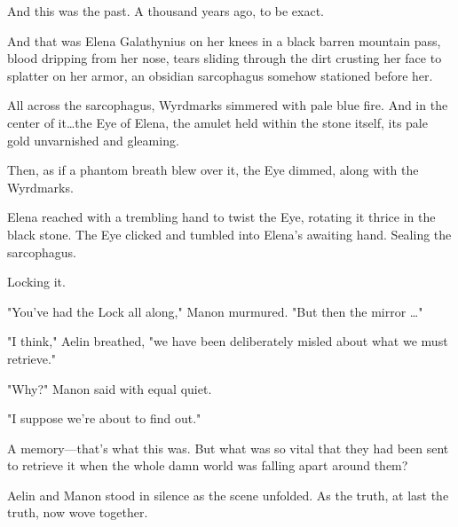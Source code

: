 And this was the past.
A thousand years ago, to be exact.

And that was Elena Galathynius on her knees in a black barren mountain pass, blood dripping from her nose, tears sliding through the dirt crusting her face to splatter on her armor, an obsidian sarcophagus somehow stationed before her.

All across the sarcophagus, Wyrdmarks simmered with pale blue fire.
And in the center of it\ldots the Eye of Elena, the amulet held within the stone itself, its pale gold unvarnished and gleaming.

Then, as if a phantom breath blew over it, the Eye dimmed, along with the Wyrdmarks.

Elena reached with a trembling hand to twist the Eye, rotating it thrice in the black stone.
The Eye clicked and tumbled into Elena's awaiting hand.
Sealing the sarcophagus.

Locking it.

"You've had the Lock all along," Manon murmured.
"But then the mirror \ldots"

"I think," Aelin breathed, "we have been deliberately misled about what we must retrieve."

"Why?"
Manon said with equal quiet.

"I suppose we're about to find out."

A memory---that's what this was.
But what was so vital that they had been sent to retrieve it when the whole damn world was falling apart around them?

Aelin and Manon stood in silence as the scene unfolded.
As the truth, at last the truth, now wove together.
